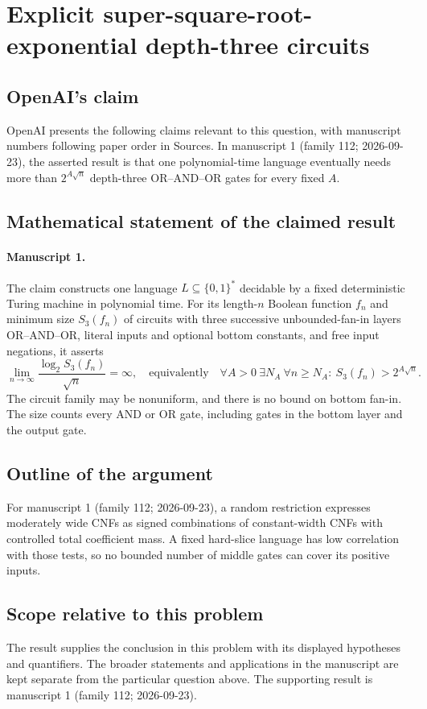 \documentclass[11pt]{article}
\begin{document}
\section*{Explicit super-square-root-exponential depth-three circuits}

\subsection{OpenAI's claim}
OpenAI presents the following claims relevant to this question, with manuscript numbers following paper order in Sources. In manuscript 1 (family 112; 2026-09-23), the asserted result is that one polynomial-time language eventually needs more than $2^{A\sqrt n}$ depth-three OR--AND--OR gates for every fixed $A$.

\subsection{Mathematical statement of the claimed result}
\paragraph{Manuscript 1.}
The claim constructs one language $L\subseteq\{0,1\}^*$ decidable by a fixed deterministic Turing machine in polynomial time. For its length-$n$ Boolean function $f_n$ and minimum size $S_3(f_n)$ of circuits with three successive unbounded-fan-in layers OR--AND--OR, literal inputs and optional bottom constants, and free input negations, it asserts
\[
 \lim_{n\to\infty}\frac{\log_2S_3(f_n)}{\sqrt n}=\infty,
 \quad\text{equivalently}\quad
 \forall A>0\ \exists N_A\ \forall n\ge N_A:\ S_3(f_n)>2^{A\sqrt n}.
\]
The circuit family may be nonuniform, and there is no bound on bottom fan-in. The size counts every AND or OR gate, including gates in the bottom layer and the output gate.

\subsection{Outline of the argument}
For manuscript 1 (family 112; 2026-09-23), a random restriction expresses moderately wide CNFs as signed combinations of constant-width CNFs with controlled total coefficient mass. A fixed hard-slice language has low correlation with those tests, so no bounded number of middle gates can cover its positive inputs.

\subsection{Scope relative to this problem}
The result supplies the conclusion in this problem with its displayed hypotheses and quantifiers. The broader statements and applications in the manuscript are kept separate from the particular question above. The supporting result is manuscript 1 (family 112; 2026-09-23).
\end{document}
